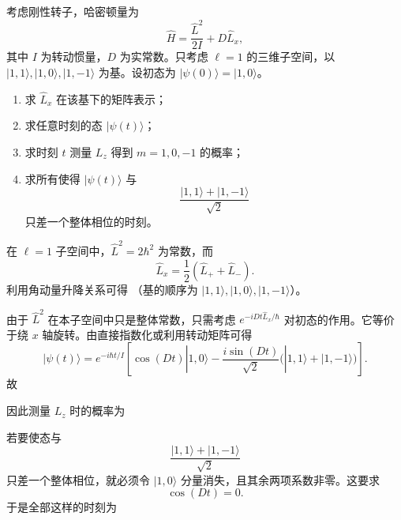 \begin{question}
考虑刚性转子，哈密顿量为
\[
\hat H=\frac{\hat L^2}{2I}+D\hat L_x,
\]
其中 $I$ 为转动惯量，$D$ 为实常数。只考虑 $\ell=1$ 的三维子空间，以 $|1,1\rangle,|1,0\rangle,|1,-1\rangle$ 为基。设初态为 $|\psi(0)\rangle=|1,0\rangle$。

\begin{enumerate}[label=(\arabic*),leftmargin=2.5em]
  \item 求 $\hat L_x$ 在该基下的矩阵表示；
  \item 求任意时刻的态 $|\psi(t)\rangle$；
  \item 求时刻 $t$ 测量 $L_z$ 得到 $m=1,0,-1$ 的概率；
  \item 求所有使得 $|\psi(t)\rangle$ 与
  \[
  \frac{|1,1\rangle+|1,-1\rangle}{\sqrt2}
  \]
  只差一个整体相位的时刻。
\end{enumerate}

\begin{solution}
在 $\ell=1$ 子空间中，$\hat L^2=2\hbar^2$ 为常数，而
\[
\hat L_x=\frac12(\hat L_++\hat L_-).
\]
利用角动量升降关系可得
（基的顺序为 $|1,1\rangle,|1,0\rangle,|1,-1\rangle$）。

由于 $\hat L^2$ 在本子空间中只是整体常数，只需考虑 $e^{-iDt\hat L_x/\hbar}$ 对初态的作用。它等价于绕 $x$ 轴旋转。由直接指数化或利用转动矩阵可得
\[
|\psi(t)\rangle=e^{-i\hbar t/I}\left[\cos(Dt)|1,0\rangle-
\frac{i\sin(Dt)}{\sqrt2}\bigl(|1,1\rangle+|1,-1\rangle\bigr)\right].
\]
故

因此测量 $L_z$ 时的概率为

若要使态与
\[
\frac{|1,1\rangle+|1,-1\rangle}{\sqrt2}
\]
只差一个整体相位，就必须令 $|1,0\rangle$ 分量消失，且其余两项系数非零。这要求
\[
\cos(Dt)=0.
\]
于是全部这样的时刻为
\end{solution}
\end{question}

